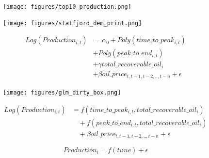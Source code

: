 \documentclass{beamer}
\begin{document}
\begin{frame}[plain]
	\begin{figure}
	\texttt{[image: figures/top10\_production.png]}
	
	\label{top10_production}	
	\end{figure}
\end{frame}

\begin{frame}
	\begin{figure}
		\texttt{[image: figures/statfjord\_dem\_print.png]}
		\label{statfjord_dem}
	\end{figure}
\end{frame}

\begin{frame}[plain]
	\begin{equation}
		\begin{split}
		 Log(Production_{i,t}) & = \alpha_0 + Poly(time\_to\_peak_{i,t}) \\ 
		 & +  Poly(peak\_to\_end_{i,t}) \\
		 & + \gamma total\_recoverable\_oil_i \\
		 & + \beta oil\_price_{t,t-1, t-2,.., t-n} + \epsilon
		\end{split}
	\label{glm_eqn}
	\end{equation}
\end{frame}

\begin{frame}[plain]
	\begin{figure}
		\texttt{[image: figures/glm\_dirty\_box.png]}
		\label{glm_dirty_box}
	\end{figure}
\end{frame}



\begin{frame}[plain]
	\begin{equation}
	\begin{split}
		Log(Production_{i,t})&=f(time\_to\_peak_{i,t}, total\_recoverable\_oil_i) \\
		& \quad + f(peak\_to\_end_{i,t}, total\_recoverable\_oil_i) \\
		& \quad + \beta oil\_price_{t,t-1, t-2,.., t-n} + \epsilon
	\end{split}
	\label{gam_price_eqn}
	\end{equation}
\end{frame}

\begin{frame}[plain]
	\begin{equation}
	Production_{t}=f(time) + \epsilon
		\label{simp_eqn}
	\end{equation}
\end{frame}
\end{document}
